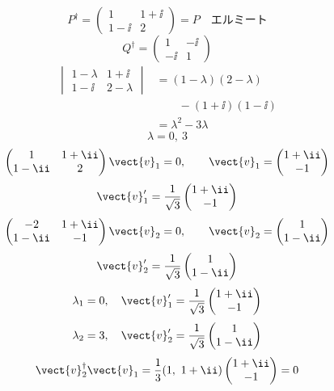 \[ P^{\dagger}=\begin{pmatrix}1 & 1+\ii\\ 1-\ii & 2\end{pmatrix}=P\quad\text{エルミート} \]
\[ Q^{\dagger}=\begin{pmatrix}1 & -\ii\\ -\ii & 1\end{pmatrix} \]
\begin{align*}
\begin{vmatrix}1-\lambda & 1+\ii\\ 1-\ii & 2-\lambda\end{vmatrix}
&=(1-\lambda)(2-\lambda)\\
&\qquad-(1+\ii)(1-\ii)\\
&=\lambda^{2}-3\lambda
\end{align*}
\[ \lambda=0,\ 3 \]
\[ \begin{pmatrix}1 & 1+\ii\\ 1-\ii & 2\end{pmatrix}\vect{v}_{1}=0,\qquad \vect{v}_{1}=\begin{pmatrix}1+\ii\\ -1\end{pmatrix} \]
\[ \vect{v}_{1}'=\frac{1}{\sqrt{3}}\begin{pmatrix}1+\ii\\ -1\end{pmatrix} \]
\[ \begin{pmatrix}-2 & 1+\ii\\ 1-\ii & -1\end{pmatrix}\vect{v}_{2}=0,\qquad \vect{v}_{2}=\begin{pmatrix}1\\ 1-\ii\end{pmatrix} \]
\[ \vect{v}_{2}'=\frac{1}{\sqrt{3}}\begin{pmatrix}1\\ 1-\ii\end{pmatrix} \]
\[ \lambda_{1}=0,\quad \vect{v}_{1}'=\frac{1}{\sqrt{3}}\begin{pmatrix}1+\ii\\ -1\end{pmatrix} \]
\[ \lambda_{2}=3,\quad \vect{v}_{2}'=\frac{1}{\sqrt{3}}\begin{pmatrix}1\\ 1-\ii\end{pmatrix} \]
\[ \vect{v}_{2}^{\dagger}\vect{v}_{1}=\frac{1}{3}(1,\ 1+\ii)\begin{pmatrix}1+\ii\\ -1\end{pmatrix}=0 \]
